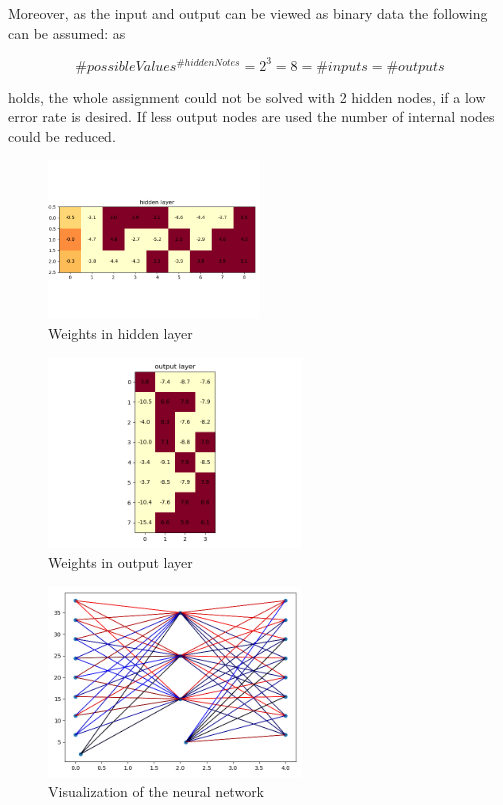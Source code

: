 \documentclass{article}
\begin{document}
Moreover, as the input and output can be viewed as binary data the following can be assumed: as

\begin{equation}
    \#possibleValues^{\#hiddenNotes} = 2^3 = 8 = \#inputs = \#outputs    
\end{equation}

holds, the whole assignment could not be solved with 2 hidden nodes, if a low error rate is desired. If less output nodes are used the number of internal nodes could be reduced.

\begin{figure}
    \centering
    \includegraphics[width=0.5\textwidth]{weights_hidden.png}
    \caption{Weights in hidden layer}
    \label{fig:weights_hidden}
\end{figure}

\begin{figure}
    \centering
    \includegraphics[width=0.6\textwidth]{weights_output.png}
    \caption{Weights in output layer}
    \label{fig:weights_output}
\end{figure}

\begin{figure}
    \centering
    \includegraphics[width=0.6\textwidth]{NN.png}
    \caption{Visualization of the neural network}
    \label{fig:NN_visualized}
\end{figure}




\end{document}
